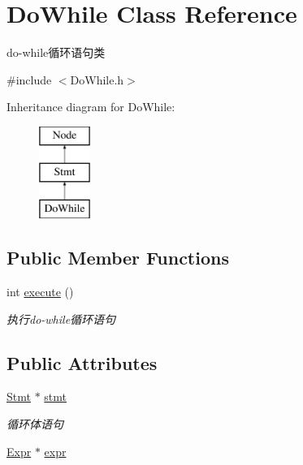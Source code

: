 \hypertarget{class_do_while}{}\section{Do\+While Class Reference}
\label{class_do_while}


do-\/while循环语句类  




{\ttfamily \#include $<$Do\+While.\+h$>$}

Inheritance diagram for Do\+While\+:\begin{figure}[H]
\begin{center}
\leavevmode
\includegraphics[height=3.000000cm]{class_do_while}
\end{center}
\end{figure}
\subsection*{Public Member Functions}
\begin{DoxyCompactItemize}
\item 
\mbox{\label{class_do_while_adb6934e033f44c6b52b1079faf1d84cf}} 
int \hyperlink{class_do_while_adb6934e033f44c6b52b1079faf1d84cf}{execute} ()
\begin{DoxyCompactList}\small\item\em 执行do-\/while循环语句 \end{DoxyCompactList}\end{DoxyCompactItemize}
\subsection*{Public Attributes}
\begin{DoxyCompactItemize}
\item 
\mbox{\label{class_do_while_a0aee68f104ddceeb30a4e061cf315e0f}} 
\hyperlink{class_stmt}{Stmt} $\ast$ \hyperlink{class_do_while_a0aee68f104ddceeb30a4e061cf315e0f}{stmt}
\begin{DoxyCompactList}\small\item\em 循环体语句 \end{DoxyCompactList}\item 
\hyperlink{class_expr}{Expr} $\ast$ \hyperlink{class_do_while_a55d5ffb9c6bee10f8375f028705e4901}{expr}
\end{DoxyCompactItemize}
